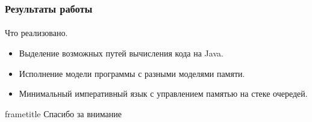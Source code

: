 \documentclass[ucs]{beamer}
\begin{document}

\begin{frame}[fragile]
  \frametitle{Результаты работы}
  \framesubtitle{}
  
  \begin{block}{Что реализовано.}
    \begin{itemize}
    \item Выделение возможных путей вычисления кода на Java.
    \item Исполнение модели программы с разными моделями памяти.
    \item Минимальный императивный язык с управлением памятью на стеке очередей.
    \end{itemize}
  \end{block}
\end{frame}

\begin{frame}
  \begin{beamercolorbox}[ht=2.5ex,dp=1ex,center,rounded=true,shadow=true]
    {frametitle}
    Спасибо за внимание
  \end{beamercolorbox}
\end{frame}
\end{document}
